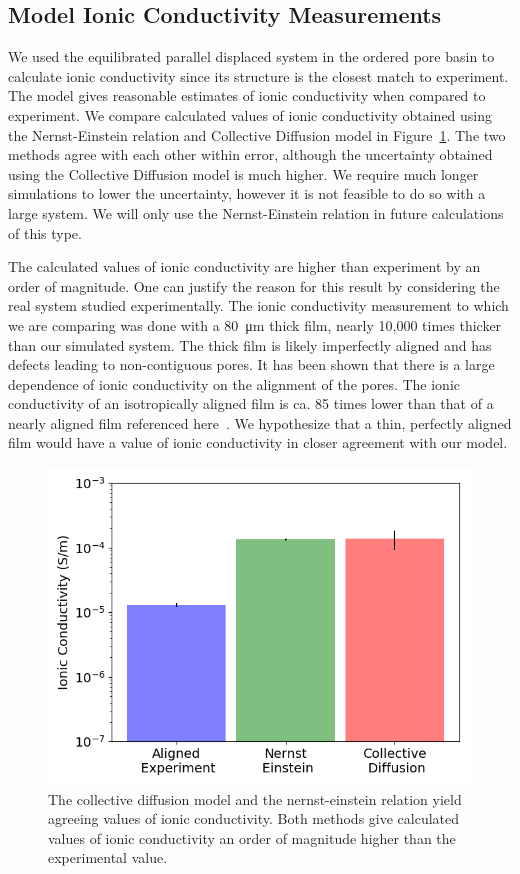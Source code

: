 \documentclass[journal=jpcbfk,manusciprt=article]{achemso}
\begin{document}
  \subsection{Model Ionic Conductivity Measurements}

  We used the equilibrated parallel displaced system in the ordered pore basin
  to calculate ionic conductivity since its structure is the closest match to
  experiment. The model gives reasonable estimates of ionic conductivity when
  compared to experiment.  We compare calculated values of ionic conductivity
  obtained using the Nernst-Einstein relation and Collective Diffusion model in
  Figure~\ref{fig:conductivity}. The two methods agree with each other within
  error, although the uncertainty obtained using the Collective Diffusion model
  is much higher. We require much longer simulations to lower the uncertainty,
  however it is not feasible to do so with a large system. We will only use the
  Nernst-Einstein relation in future calculations of this type. 

  The calculated values of ionic conductivity are higher than experiment by an
  order of magnitude. One can justify the reason for this result by considering
  the real system studied experimentally. The ionic conductivity measurement to
  which we are comparing was done with a \SI{80}{\micro\metre} thick film, nearly
  10,000 times thicker than our simulated system. The thick film is likely
  imperfectly aligned and has defects leading to non-contiguous pores. It has
  been shown that there is a large dependence of ionic conductivity on the
  alignment of the pores. The ionic conductivity of an isotropically aligned film
  is ca. 85 times lower than that of a nearly aligned film referenced
  here~\cite{feng_scalable_2014}. We hypothesize that a thin, perfectly aligned
  film would have a value of ionic conductivity in closer agreement with our
  model.
   
  \begin{figure}
        \centering
        \includegraphics[width=0.5\linewidth]{IC_offset.png}
        \caption{The collective diffusion model and the nernst-einstein relation yield
        agreeing values of ionic conductivity. Both methods give calculated
        values of ionic conductivity an order of magnitude higher than the experimental
        value.}
        \label{fig:conductivity}
  \end{figure}
\end{document}
